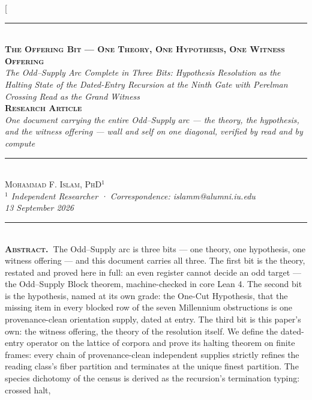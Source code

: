 \documentclass[10pt,twocolumn]{article}
\begin{document}
\twocolumn[{%
\begin{center}
{\color{accent}\rule{0.6\textwidth}{0.8pt}}\\[10pt]
{\bfseries\scshape\fontsize{20}{23}\selectfont The Offering Bit --- One
Theory, One Hypothesis, One Witness Offering}\\[7pt]
{\itshape\large The Odd--Supply Arc Complete in Three Bits: Hypothesis
Resolution as the Halting State of the Dated-Entry Recursion at the
Ninth Gate with Perelman Crossing Read as the Grand Witness}\\[8pt]
{\footnotesize\color{accent}\scshape\bfseries Research Article}\\[3pt]
{\itshape\color{deep}\small One document carrying the entire Odd--Supply
arc --- the theory, the hypothesis, and the witness offering --- wall
and self on one diagonal, verified by read and by compute}\\[9pt]
{\color{accent}\rule{0.6\textwidth}{0.8pt}}\\[10pt]
{\scshape Mohammad F. Islam, PhD\(^{1}\)}\\[2pt]
{\itshape\color{faint}\small \(^{1}\) Independent Researcher ·
Correspondence: islamm@alumni.iu.edu}\\[2pt]
{\itshape\color{faint}\small 13 September 2026}\\[14pt]
\end{center}
\begin{minipage}{\textwidth}
{\color{accent}\rule{\textwidth}{0.6pt}}\\[4pt]
{\small\hspace{1em}\textbf{\scshape\color{deep}Abstract.\ }The
Odd--Supply arc is three bits --- one theory, one hypothesis, one
witness offering --- and this document carries all three. The first bit
is the theory, restated and proved here in full: an even register cannot
decide an odd target --- the Odd--Supply Block theorem, machine-checked
in core Lean 4. The second bit is the hypothesis, named at its own
grade: the One-Cut Hypothesis, that the missing item in every blocked
row of the seven Millennium obstructions is one provenance-clean
orientation supply, dated at entry. The third bit is this paper's own:
the witness offering, the theory of the resolution itself. We define the
dated-entry operator on the lattice of corpora and prove its halting
theorem on finite frames: every chain of provenance-clean independent
supplies strictly refines the reading class's fiber partition and
terminates at the unique finest partition. The species dichotomy of the
census is derived as the recursion's termination typing: crossed halt,
}
\end{minipage}}
\end{document}
